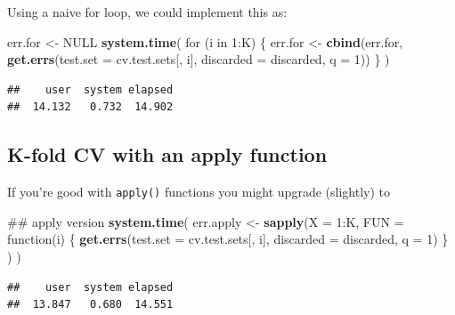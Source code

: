 \documentclass[]{article}
\newenvironment{Shaded}{\begin{snugshade}}{\end{snugshade}}
\newcommand{\KeywordTok}[1]{\textcolor[rgb]{0.13,0.29,0.53}{\textbf{{#1}}}}
\newcommand{\DataTypeTok}[1]{\textcolor[rgb]{0.13,0.29,0.53}{{#1}}}
\newcommand{\DecValTok}[1]{\textcolor[rgb]{0.00,0.00,0.81}{{#1}}}
\newcommand{\StringTok}[1]{\textcolor[rgb]{0.31,0.60,0.02}{{#1}}}
\newcommand{\OtherTok}[1]{\textcolor[rgb]{0.56,0.35,0.01}{{#1}}}
\newcommand{\NormalTok}[1]{{#1}}
\begin{document}
Using a naive for loop, we could implement this as:

\begin{Shaded}
\begin{Highlighting}[]
\NormalTok{err.for <-}\StringTok{ }\OtherTok{NULL}
\KeywordTok{system.time}\NormalTok{(}
    \NormalTok{for (i in }\DecValTok{1}\NormalTok{:K) \{}
        \NormalTok{err.for <-}\StringTok{ }\KeywordTok{cbind}\NormalTok{(err.for, }\KeywordTok{get.errs}\NormalTok{(}\DataTypeTok{test.set =} \NormalTok{cv.test.sets[, i],}
                                           \DataTypeTok{discarded =} \NormalTok{discarded,}
                                           \DataTypeTok{q =} \DecValTok{1}\NormalTok{))}
        \NormalTok{\}}
    \NormalTok{)}
\end{Highlighting}
\end{Shaded}

\begin{verbatim}
##    user  system elapsed 
##  14.132   0.732  14.902
\end{verbatim}

\subsection{K-fold CV with an apply
function}\label{k-fold-cv-with-an-apply-function}

If you're good with \texttt{apply()} functions you might upgrade
(slightly) to

\begin{Shaded}
\begin{Highlighting}[]
\NormalTok{## apply version}
\KeywordTok{system.time}\NormalTok{(}
    \NormalTok{err.apply <-}\StringTok{ }\KeywordTok{sapply}\NormalTok{(}\DataTypeTok{X =} \DecValTok{1}\NormalTok{:K, }
                        \DataTypeTok{FUN =} \NormalTok{function(i) \{}
                            \KeywordTok{get.errs}\NormalTok{(}\DataTypeTok{test.set =} \NormalTok{cv.test.sets[, i],}
                                     \DataTypeTok{discarded =} \NormalTok{discarded,}
                                     \DataTypeTok{q =} \DecValTok{1}\NormalTok{)}
                            \NormalTok{\}}
                        \NormalTok{)}
    \NormalTok{)}
\end{Highlighting}
\end{Shaded}

\begin{verbatim}
##    user  system elapsed 
##  13.847   0.680  14.551
\end{verbatim}
\end{document}
